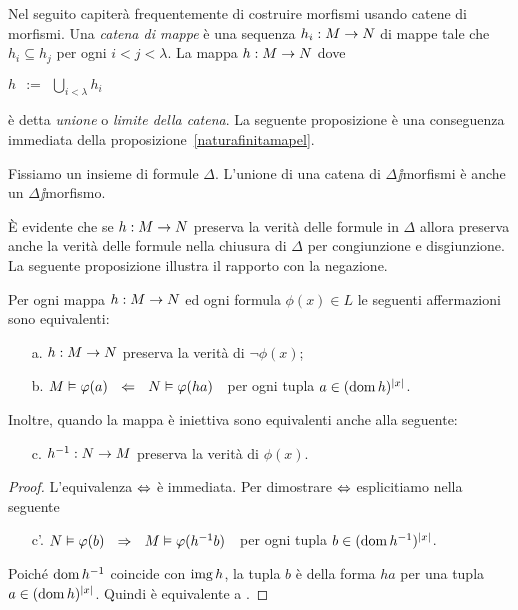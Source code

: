 Nel seguito capiter\`a frequentemente di costruire morfismi usando catene di morfismi. Una \emph{catena di mappe\/} \`e una sequenza $h_i:M\rightarrow N$ di mappe tale che  $h_i\subseteq h_{j}$ per ogni $i<j<\lambda$. La mappa $h:M\rightarrow N$ dove 

\hfil$\displaystyle h\ \ :=\ \ \bigcup_{i<\lambda} h_i$

\`e detta \emph{unione\/} o \emph{limite della catena}. La seguente proposizione \`e una conseguenza immediata della proposizione~\ref{naturafinitamapel}.

\begin{proposition}
\label{cateneisomorfismiparziali}
Fissiamo un insieme di formule $\Delta$. L'unione di una catena di $\Delta\jj$morfismi \`e anche un $\Delta\jj$morfismo.\QED
\end{proposition}

\`E evidente che se $h:M\rightarrow N$ preserva la verit\`a delle formule in $\Delta$ allora preserva anche la verit\`a delle formule nella chiusura di $\Delta$ per congiunzione e disgiunzione. La seguente proposizione illustra il rapporto con la negazione.

\begin{proposition}\label{immparneginv}
Per ogni mappa $h:M\rightarrow N$ ed ogni formula $\phi(x)\in L$ le seguenti affermazioni sono equivalenti:
\begin{itemize}
\item[a.] $h:M\rightarrow N$ preserva la verit\`a di $\neg\phi(x)$;
\item[b.] $M\models\phi(a)\ \ \PMI\ \ N\models\phi(ha)$\ \  per ogni tupla $a\in(\mathop{\rm dom} h)^{|x|}$.
\end{itemize}
Inoltre, quando la mappa \`e iniettiva sono equivalenti anche alla seguente:
\begin{itemize}
\item[c.]   $h^{-1}:N\rightarrow M$ preserva la verit\`a di $\phi(x)$.\QED
\end{itemize}
\end{proposition}
\begin{proof}
L'equivalenza $\Leftrightarrow$ \`e immediata. Per dimostrare $\Leftrightarrow$ esplicitiamo  nella seguente
\begin{itemize}
\item[c'.]$N\models\phi(b)\ \ \IMP\ \ M\models\phi(h^{-1}b)$\ \  per ogni tupla $b\in(\mathop{\rm dom} h^{-1})^{|x|}$.
\end{itemize}
Poich\'e $\mathop{\rm dom} h^{-1}$ coincide con $\mathop{\rm img} h$, la tupla $b$ \`e della forma $ha$ per una tupla  $a\in(\mathop{\rm dom} h)^{|x|}$. Quindi  \`e equivalente a .
\end{proof}

